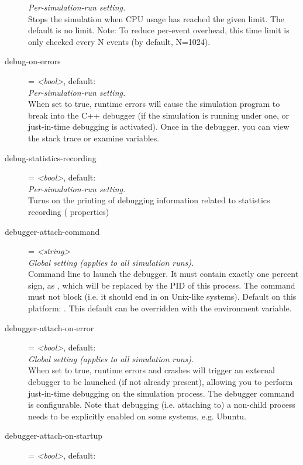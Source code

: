 \begin{description}
    \textit{Per-simulation-run setting.}\\
    Stops the simulation when CPU usage has reached the given limit. The
    default is no limit. Note: To reduce per-event overhead, this time limit is
    only checked every N events (by default, N=1024).
\item[debug-on-errors] = \textit{<bool>}, default: \\
    \textit{Per-simulation-run setting.}\\
    When set to true, runtime errors will cause the simulation program to break
    into the C++ debugger (if the simulation is running under one, or
    just-in-time debugging is activated). Once in the debugger, you can view
    the stack trace or examine variables.
\item[debug-statistics-recording] = \textit{<bool>}, default: \\
    \textit{Per-simulation-run setting.}\\
    Turns on the printing of debugging information related to statistics
    recording ( properties)
\item[debugger-attach-command] = \textit{<string>}\\
    \textit{Global setting (applies to all simulation runs).}\\
    Command line to launch the debugger. It must contain exactly one percent
    sign, as , which will be replaced by the PID of this process. The
    command must not block (i.e. it should end in \ttt{\&} on Unix-like
    systems). Default on this platform: .
    This default can be overridden with the 
    environment variable.
\item[debugger-attach-on-error] = \textit{<bool>}, default: \\
    \textit{Global setting (applies to all simulation runs).}\\
    When set to true, runtime errors and crashes will trigger an external
    debugger to be launched (if not already present), allowing you to perform
    just-in-time debugging on the simulation process. The debugger command is
    configurable. Note that debugging (i.e. attaching to) a non-child process
    needs to be explicitly enabled on some systems, e.g. Ubuntu.
\item[debugger-attach-on-startup] = \textit{<bool>}, default: \\

\end{description}
